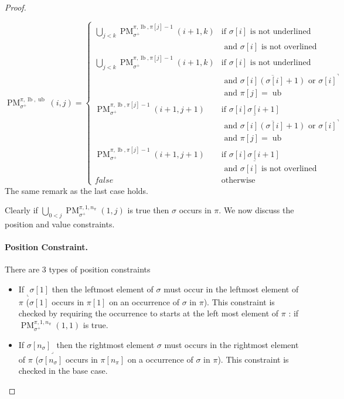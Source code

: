 \documentclass[a4paper]{llncs}
\newcommand{\ptext}{\pi}
\newcommand{\pmotif}{\sigma}
\newcommand{\pbmotif}{\pmotif^+}
\DeclareMathOperator{\PMa}{PM}
\newcommand{\PM}[6]{\PMa_{{#1}}^{{#2},{#3},{#4}}({#5},{#6})}
\DeclareMathOperator{\lb}{lb}
\DeclareMathOperator{\ub}{ub}
\begin{document}
\begin{proof}
\begin{itemize}
	$$
	\PM{\pbmotif}{\ptext}{\lb}{\ub}{i}{j}=
	\begin{cases}
			\bigcup_{j<k} \PM{\pbmotif}{\ptext}{\lb}{\ptext[j]-1}{i+1}{k}
				& \text{if $\pmotif[i]$ is not underlined } \\
				& \text{ and $\pmotif[i]$ is not overlined} \\
			\bigcup_{j<k} \PM{\pbmotif}{\ptext}{\lb}{\ptext[j]-1}{i+1}{k}
				& \text{if $\pmotif[i]$ is not underlined } \\
				& \text{ and $\overline{\pmotif[i](\pmotif[i]+1)}$ or ${\pmotif[i]}^\urcorner$}\\
				& \text{ and $\ptext[j]=\ub$} \\
			\PM{\pbmotif}{\ptext}{\lb}{\ptext[j]-1}{i+1}{j+1}
				& \text{if $\underline{\pmotif[i]\pmotif[i+1]}$ } \\
				& \text{ and $\overline{\pmotif[i](\pmotif[i]+1)}$ or ${\pmotif[i]}^\urcorner$}\\
				& \text{ and $\ptext[j]=\ub$} \\
			\PM{\pbmotif}{\ptext}{\lb}{\ptext[j]-1}{i+1}{j+1}
				& \text{if $\underline{\pmotif[i]\pmotif[i+1]}$ } \\
				& \text{ and $\pmotif[i]$ is not overlined} \\
			false & \text{otherwise}
	\end{cases}
	$$	
	The same remark as the last case holds.

\end{itemize}

Clearly if $\bigcup_{0<j} \PM{\pbmotif}{\ptext}{1}{n_\ptext}{1}{j}$ is true then $\sigma$ occurs in $\pi$. We now discuss the position and value constraints.
\paragraph{Position Constraint.} There are 3 types of position constraints 
\begin{itemize}
	\item If $_\llcorner{\sigma[1]}$ then the leftmost element of $\sigma$  must occur in the leftmost element of $\pi$ ($\pmotif[1]$ occurs in $\ptext[1]$ on an occurrence of $\pmotif$ in $\ptext$). This constraint is checked by requiring the occurrence to starts at the left most element of $\ptext$ : if  $\PM{\pbmotif}{\ptext}{1}{n_\ptext}{1}{1}$ is true.
	
	\item If ${\pmotif[n_\pmotif]}_\lrcorner$ then the rightmost element $\sigma$ must occurs in the rightmost element of $\pi$ ($\pmotif[n_\pmotif]$ occurs in $\ptext[n_\ptext]$ on a occurrence of $\pmotif$ in $\ptext$). This constraint is checked in the base case.


\end{itemize}
\end{proof}
\end{document}
